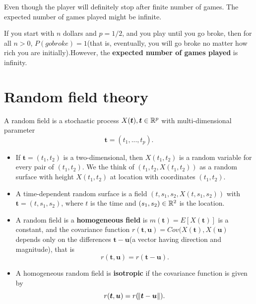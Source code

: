 \begin{refsection}
\begin{remark}
	Even though the player will definitely stop after finite number of games. The expected number of games played might be infinite.
\end{remark}


\begin{lemma}
	If you start with $n$ dollars and $p=1/2$, and you play until you go broke, then for all $n > 0$, $P(go broke)=1$(that is, eventually, you will go broke no matter how rich you are initially).However, the \textbf{expected number of games played} is infinity.
\end{lemma}

















\section{Random field theory}

\begin{definition}\cite[216]{lindgren2012stationary}
A random field is a stochastic process $X(\bm{t}),\bm{t}\in \mathbb{R}^p$ with multi-dimensional parameter $$\bm{t} = (t_1,...,t_p).$$	
\end{definition}


\begin{example}\cite[216]{lindgren2012stationary}\hfill
\begin{itemize}
	\item If $\bm{t} = (t_1,t_2)$ is a two-dimensional, then $X(t_1,t_2)$ is a random variable for every pair of $(t_1,t_2)$. We the think of $(t_1,t_2,X(t_1,t_2))$ as a random surface with height $X(t_1,t_2)$ at location with coordinates $(t_1,t_2)$.
	\item A time-dependent random surface is a field $(t,s_1,s_2,X(t,s_1,s_2))$ with $\bm{t} = (t,s_1,s_2)$, where $t$ is the time and $(s_1,s_2)\in \mathbb{R}^2$ is the location.
\end{itemize}	
\end{example}


\begin{definition}\cite[217,221]{lindgren2012stationary}\hfill
\begin{itemize}
	\item A random field is a \textbf{homogeneous field} is $m(\bm{t}) = E[X(\bm{t})]$ is a constant, and the covariance function $r(\bm{t},\bm{u}) = Cov(X(\bm{t}),X(\bm{u})$	depends only on the differences $\bm{t}-\bm{u}$(a vector having direction and magnitude), that is
	$$r(\bm{t},\bm{u}) = r(\bm{t}-\bm{u}).$$
	\item A homogeneous random field is \textbf{isotropic} if the covariance function is given by
	$$r(\bm{t},\bm{u}) = r(\norm{\bm{t}-\bm{u}}).$$
	

\end{itemize}
\end{definition}
\end{refsection}
